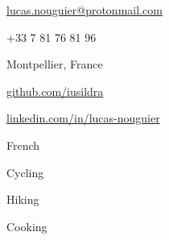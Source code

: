 \documentclass[11pt]{spidercv}
\begin{document}
\begin{TopBar}{\ColorTextSide}

  \vspace{-0.7cm}
  \begin{multicols}{2}
    \begin{ItemList}{\ColorHighlight}
      \item [\Large\faAt]\href{mailto:lucas.nouguier@protonmail.com}{lucas.nouguier@protonmail.com}
      \item [\Large\faPhone] +33 7 81 76 81 96
      \item [\Large\faHome] Montpellier, France
      \columnbreak
      \item [\Large\faGithub] \href{https://github.com/iusildra}{github.com/iusildra}
      \item [\Large\faLinkedinSquare] \href{https://www.linkedin.com/in/lucas-nouguier/}{linkedin.com/in/lucas-nouguier}
      \item [\Large\faLanguage] French
    \end{ItemList}
  \end{multicols}

  \vspace{-0.4cm}
  \vspace{-0.6cm}
  \begin{multicols}{3}
    \begin{ItemList}{\ColorHighlight}
      \item [] Cycling
      \item [] Hiking
      \item [] Cooking
    \end{ItemList}
  \end{multicols}
\end{TopBar}
\end{document}
